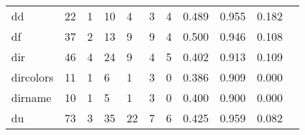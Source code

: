 \begin{longtable}{lp{1.20cm}p{1.20cm}p{1.20cm}p{1.20cm}p{1.20cm}p{1.20cm}p{1.20cm}p{1.20cm}p{1.20cm}p{1.20cm}}
dd        &                                    22 &                                                  1 &                                                 10 &                                                  4 &                                                  3 &                                                  4 &                                         0.489 &                                              0.955 &                                              0.182 \\
df        &                                    37 &                                                  2 &                                                 13 &                                                  9 &                                                  9 &                                                  4 &                                         0.500 &                                              0.946 &                                              0.108 \\
dir       &                                    46 &                                                  4 &                                                 24 &                                                  9 &                                                  4 &                                                  5 &                                         0.402 &                                              0.913 &                                              0.109 \\
dircolors &                                    11 &                                                  1 &                                                  6 &                                                  1 &                                                  3 &                                                  0 &                                         0.386 &                                              0.909 &                                              0.000 \\
dirname   &                                    10 &                                                  1 &                                                  5 &                                                  1 &                                                  3 &                                                  0 &                                         0.400 &                                              0.900 &                                              0.000 \\
du        &                                    73 &                                                  3 &                                                 35 &                                                 22 &                                                  7 &                                                  6 &                                         0.425 &                                              0.959 &                                              0.082 \\

\end{longtable}
